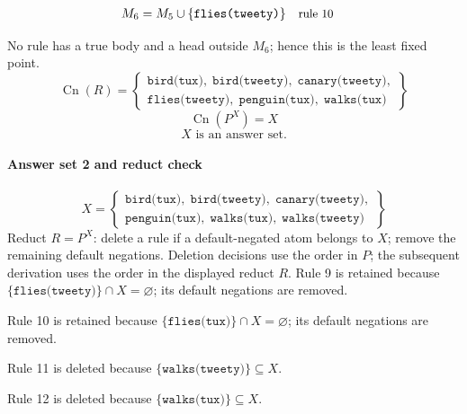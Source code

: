 \documentclass[a4paper,11pt]{article}
\newif\ifexplain
\newcommand{\explain}[1]{\ifexplain\begin{erklbox}#1\end{erklbox}\fi}
\newcommand{\why}[1]{\text{\small #1}}
\newcommand{\at}[1]{\texttt{#1}}
\begin{document}
\begin{align*}
M_{6} &= M_{5}\cup \{\at{flies(tweety)}\} && \why{rule 10}
\end{align*}
\explain{Für $\at{flies(tweety)}$ brauchen wir $\at{bird(tweety)}$. Weil diese Voraussetzungen bereits hergeleitet sind, dürfen wir den Regelkopf jetzt aufnehmen und alle bisherigen Atome behalten; bei einer fehlenden Voraussetzung würde diese Regel dagegen noch nichts beitragen.}
No rule has a true body and a head outside $M_{6}$; hence this is the least fixed point.
\[
\operatorname{Cn}(R)=\left\{\begin{gathered}\at{bird(tux)},\;\at{bird(tweety)},\;\at{canary(tweety)},\\\at{flies(tweety)},\;\at{penguin(tux)},\;\at{walks(tux)}\end{gathered}\right\}
\]
\[
\operatorname{Cn}(P^X)=X
\]
\[
\boxed{X\text{ is an answer set.}}
\]
\paragraph{Answer set 2 and reduct check}
\[
X=\left\{\begin{gathered}\at{bird(tux)},\;\at{bird(tweety)},\;\at{canary(tweety)},\\\at{penguin(tux)},\;\at{walks(tux)},\;\at{walks(tweety)}\end{gathered}\right\}
\]
Reduct $R=P^X$: delete a rule if a default-negated atom belongs to $X$; remove the remaining default negations. Deletion decisions use the order in $P$; the subsequent derivation uses the order in the displayed reduct $R$.
Rule 9 is retained because $\{\at{flies(tweety)}\}\cap X=\varnothing$; its default negations are removed.

Rule 10 is retained because $\{\at{flies(tux)}\}\cap X=\varnothing$; its default negations are removed.

Rule 11 is deleted because $\{\at{walks(tweety)}\}\subseteq X$.

Rule 12 is deleted because $\{\at{walks(tux)}\}\subseteq X$.
\end{document}
